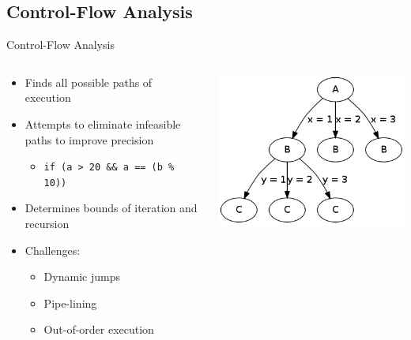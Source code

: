 \documentclass{beamer}
\begin{document}
\subsection{Control-Flow Analysis}
\begin{frame}{Control-Flow Analysis}
  \begin{columns}
    \begin{column}{0.63\textwidth}
      \begin{itemize}
        \item Finds all possible paths of execution
        \item Attempts to eliminate infeasible paths to improve precision
          \begin{itemize}
            \item \texttt{if (a > 20 \&\& a == (b \% 10))}
          \end{itemize}
        \item Determines bounds of iteration and recursion
        \item<2-> Challenges:
          \begin{itemize}
            \item Dynamic jumps
            \item Pipe-lining
            \item Out-of-order execution
          \end{itemize}
      \end{itemize}
    \end{column}
    \begin{column}{0.37\textwidth}
      \includegraphics[scale=0.35]{controlflowanalysis.png}
    \end{column}
  \end{columns}
\end{frame}
\end{document}

